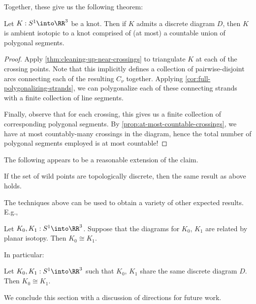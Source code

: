 Together, these give us the following theorem:
\begin{theorem}\label{thm:discrete-diagram-countably-polygonal}
  Let $K : S^1 \into \RR^3$ be a knot. Then if $K$ admits a discrete
  diagram $D$, then $K$ is ambient isotopic to a knot comprised of (at
  most) a countable union of polygonal segments.
\end{theorem}
\begin{proof}
  Apply \cref{thm:cleaning-up-near-crossings} to triangulate $K$ at
  each of the crossing points. Note that this implicitly defines a
  collection of pairwise-disjoint arcs connecting each of the
  resulting $C_\nu$ together. Applying
  \cref{cor:full-polygonalizing-strands}, we can polygonalize each of
  these connecting strands with a finite collection of line segments.

  Finally, observe that for each crossing, this gives us a finite
  collection of corresponding polygonal segments. By
  \cref{prop:at-most-countable-crossings}, we have at most
  countably-many crossings in the diagram, hence the total number of
  polygonal segments employed is at most countable!
\end{proof}
The following appears to be a reasonable extension of the claim.
\begin{conjecture}
  If the set of wild points are topologically discrete, then the same
  result as above holds.
\end{conjecture}

The techniques above can be used to obtain a variety of other expected
results. E.g.,
\begin{proposition}
  Let $K_0, K_1 : S^1 \into \RR^3$. Suppose that the diagrams for
  $K_0$, $K_1$ are related by planar isotopy. Then $K_0 \cong K_1$.
\end{proposition}
In particular:
\begin{corollary}
  Let $K_0, K_1 : S^1\into \RR^3$ such that $K_0$, $K_1$ share the
  same discrete diagram $D$. Then $K_0 \cong K_1$.
\end{corollary}
We conclude this section with a discussion of directions for future
work.


